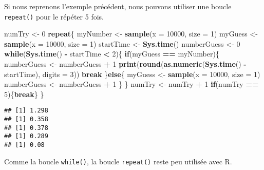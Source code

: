 \documentclass[]{book}
\newenvironment{Shaded}{\begin{snugshade}}{\end{snugshade}}
\newcommand{\KeywordTok}[1]{\textcolor[rgb]{0.13,0.29,0.53}{\textbf{#1}}}
\newcommand{\DataTypeTok}[1]{\textcolor[rgb]{0.13,0.29,0.53}{#1}}
\newcommand{\DecValTok}[1]{\textcolor[rgb]{0.00,0.00,0.81}{#1}}
\newcommand{\StringTok}[1]{\textcolor[rgb]{0.31,0.60,0.02}{#1}}
\newcommand{\ControlFlowTok}[1]{\textcolor[rgb]{0.13,0.29,0.53}{\textbf{#1}}}
\newcommand{\OperatorTok}[1]{\textcolor[rgb]{0.81,0.36,0.00}{\textbf{#1}}}
\newcommand{\NormalTok}[1]{#1}
\theoremstyle{definition}
\theoremstyle{definition}
\theoremstyle{definition}
\theoremstyle{remark}
\begin{document}
Si nous reprenons l'exemple précédent, nous pouvons utiliser une boucle
\texttt{repeat()} pour le répéter 5 fois.

\begin{Shaded}
\begin{Highlighting}[]
\NormalTok{numTry <-}\StringTok{ }\DecValTok{0}
\ControlFlowTok{repeat}\NormalTok{\{}
\NormalTok{  myNumber <-}\StringTok{ }\KeywordTok{sample}\NormalTok{(}\DataTypeTok{x =} \DecValTok{10000}\NormalTok{, }\DataTypeTok{size =} \DecValTok{1}\NormalTok{)}
\NormalTok{  myGuess <-}\StringTok{ }\KeywordTok{sample}\NormalTok{(}\DataTypeTok{x =} \DecValTok{10000}\NormalTok{, }\DataTypeTok{size =} \DecValTok{1}\NormalTok{)}
\NormalTok{  startTime <-}\StringTok{ }\KeywordTok{Sys.time}\NormalTok{()}
\NormalTok{  numberGuess <-}\StringTok{ }\DecValTok{0}
  \ControlFlowTok{while}\NormalTok{(}\KeywordTok{Sys.time}\NormalTok{() }\OperatorTok{-}\StringTok{ }\NormalTok{startTime }\OperatorTok{<}\StringTok{ }\DecValTok{2}\NormalTok{)\{}
    \ControlFlowTok{if}\NormalTok{(myGuess }\OperatorTok{==}\StringTok{ }\NormalTok{myNumber)\{}
\NormalTok{      numberGuess <-}\StringTok{ }\NormalTok{numberGuess }\OperatorTok{+}\StringTok{ }\DecValTok{1}
      \KeywordTok{print}\NormalTok{(}\KeywordTok{round}\NormalTok{(}\KeywordTok{as.numeric}\NormalTok{(}\KeywordTok{Sys.time}\NormalTok{() }\OperatorTok{-}\StringTok{ }\NormalTok{startTime), }\DataTypeTok{digits =} \DecValTok{3}\NormalTok{))}
      \ControlFlowTok{break}
\NormalTok{    \}}\ControlFlowTok{else}\NormalTok{\{}
\NormalTok{      myGuess <-}\StringTok{ }\KeywordTok{sample}\NormalTok{(}\DataTypeTok{x =} \DecValTok{10000}\NormalTok{, }\DataTypeTok{size =} \DecValTok{1}\NormalTok{)}
\NormalTok{      numberGuess <-}\StringTok{ }\NormalTok{numberGuess }\OperatorTok{+}\StringTok{ }\DecValTok{1}
\NormalTok{    \}}
\NormalTok{  \}}
\NormalTok{  numTry <-}\StringTok{ }\NormalTok{numTry }\OperatorTok{+}\StringTok{ }\DecValTok{1}
  \ControlFlowTok{if}\NormalTok{(numTry }\OperatorTok{==}\StringTok{ }\DecValTok{5}\NormalTok{)\{}\ControlFlowTok{break}\NormalTok{\}}
\NormalTok{\}}
\end{Highlighting}
\end{Shaded}

\begin{verbatim}
## [1] 1.298
## [1] 0.358
## [1] 0.378
## [1] 0.289
## [1] 0.08
\end{verbatim}

Comme la boucle \texttt{while()}, la boucle \texttt{repeat()} reste peu
utilisée avec R.
\end{document}
